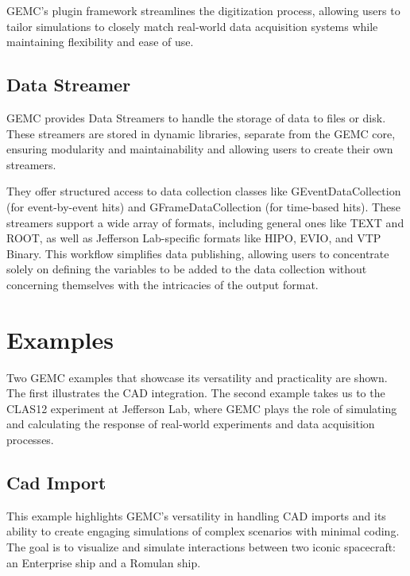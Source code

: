 GEMC's plugin framework streamlines the digitization process, allowing users to tailor simulations
to closely match real-world data acquisition systems while maintaining flexibility and ease of use.

\subsection{Data Streamer}
\label{subsec:data_streamer}

GEMC provides Data Streamers to handle the storage of data to files or disk.
These streamers are stored in dynamic libraries, separate from the GEMC core, ensuring modularity
and maintainability and allowing users to create their own streamers.

They offer structured access to data collection classes like GEventDataCollection (for event-by-event hits)
and GFrameDataCollection (for time-based hits).
These streamers support a wide array of formats, including general ones like TEXT and ROOT,
as well as Jefferson Lab-specific formats like HIPO, EVIO, and VTP Binary.
This workflow simplifies data publishing, allowing users to concentrate solely on defining the variables to be
added to the data collection without concerning themselves with the intricacies of the output format.


\section{Examples}
\label{sec:examples}

Two GEMC examples that showcase its versatility and practicality are shown.
The first illustrates the CAD integration.
The second example takes us to the CLAS12 experiment at Jefferson Lab, where GEMC plays the role
of simulating and calculating the response of real-world experiments and data acquisition processes.

\subsection{Cad Import}
\label{subsec:cad_import}

This example highlights GEMC's versatility in handling CAD imports and its ability to create engaging
simulations of complex scenarios with minimal coding.
The goal is to visualize and simulate interactions between two iconic spacecraft: an Enterprise ship and a Romulan ship.

